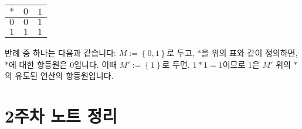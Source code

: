 \documentclass[12pt]{paper}
\begin{document}
  \begin{table}[ht]
    \centering
    \label{t1}
    \begin{tabular}{|c|c|c|}
    \noalign{\smallskip}\noalign{\smallskip}\hline
    $*$ & $0$ & $1$ \\
    \hline
    $0$ & $0$ & $1$ \\
    \hline
    $1$ & $1$ & $1$ \\
    \hline
    \end{tabular}
  \end{table}
  반례 중 하나는 다음과 같습니다:
  $M := \left\{ 0 , 1 \right\}$로 두고,
  $*$을 위의 표와 같이 정의하면, 
  $*$에 대한 항등원은 $0$입니다.
  이때 $M' := \left\{ 1 \right\}$로 두면,
  $1 * 1 = 1$이므로 $1$은 $M'$ 위의 $*$의 유도된 연산의 항등원입니다.

  \section{2주차 노트 정리}
  \hspace{12pt}
\end{document}
